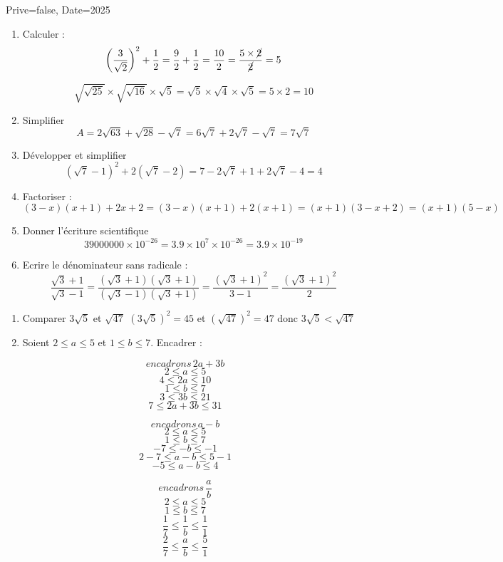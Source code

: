 \documentclass[a4paper,12pt]{article}
\begin{document}
\begin{Maquette}[Exam]{Prive=false, Date=2025}

\begin{exercice}[BaremeDetaille]
\begin{enumerate}
\item{} Calculer :
$$\left(\dfrac{3}{\sqrt{2}}\right)^{2}+\dfrac{1}{2}=\dfrac{9}{2}+\dfrac{1}{2}=\dfrac{10}{2}=\dfrac{5\times \cancel{2}}{\cancel{2}}=5$$

$$\sqrt{\sqrt{25}}\times \sqrt{\sqrt{16}}\times\sqrt{5}=\sqrt{5}\times\sqrt{4}\times\sqrt{5}=5\times 2=10$$
\item{} Simplifier 
$$A=2\sqrt{63}+\sqrt{28}-\sqrt{7}=6\sqrt{7}+2\sqrt{7}-\sqrt{7}=7\sqrt{7}$$
\item{} Développer et simplifier
 $$\left(\sqrt{7}-1\right)^{2}+2(\sqrt{7}-2)=7-2\sqrt{7}+1+2\sqrt{7}
 -4=4$$
 \item{} Factoriser :
$$(3-x)(x+1)+2x+2=(3-x)(x+1)+2(x+1)=(x+1)(3-x+2)=(x+1)(5-x)$$
\item{}Donner l'écriture scientifique
$$39000000\times 10^{-26}=3.9\times 10^{7}\times 10^{-26}=3.9\times 10^{-19}$$
\item{} Ecrire le dénominateur sans radicale :
$$\dfrac{\sqrt{3}+1}{\sqrt{3}-1}=\dfrac{(\sqrt{3}+1)(\sqrt{3}+1)}{(\sqrt{3}-1)(\sqrt{3}+1)}=\dfrac{(\sqrt{3}+1)^{2}}{3-1}=\dfrac{(\sqrt{3}+1)^{2}}{2}$$
\end{enumerate}	
\end{exercice}

\begin{exercice}[BaremeDetaille]
\begin{enumerate}
\item{} Comparer $3\sqrt{5}$ et $\sqrt{47}$\newline
$(3\sqrt{5})^{2}=45$ et $(\sqrt{47})^{2}=47$ donc $3\sqrt{5}< \sqrt{47}$
\item{} Soient $2\leq a\leq 5$ et $1\leq b\leq 7$. Encadrer :
\end{enumerate}
\begin{minipage}{.3\linewidth}
$$encadrons \,2a+3b$$
$$2\leq a\leq 5$$
$$4\leq 2a\leq 10$$
$$1\leq b\leq 7$$
$$3\leq 3b\leq 21$$
$$7\leq 2a+3b\leq 31$$
\end{minipage}\hfill\vrule\hfill%
\begin{minipage}{.3\linewidth}
$$encadrons\, a-b$$
$$2\leq a\leq 5$$
$$1\leq b\leq 7$$
$$-7\leq -b\leq -1$$
$$2-7\leq a-b\leq 5-1$$
$$-5\leq a-b\leq 4$$
\end{minipage}\hfill\vrule\hfill%
\begin{minipage}{.3\linewidth}
$$encadrons\, \dfrac{a}{b}$$
$$2\leq a\leq 5$$
$$1\leq b\leq 7$$
$$\dfrac{1}{7}\leq \dfrac{1}{b}\leq \dfrac{1}{1}$$
$$\dfrac{2}{7}\leq \dfrac{a}{b}\leq \dfrac{5}{1}$$
\end{minipage}
\end{exercice}


\end{Maquette}
\end{document}
